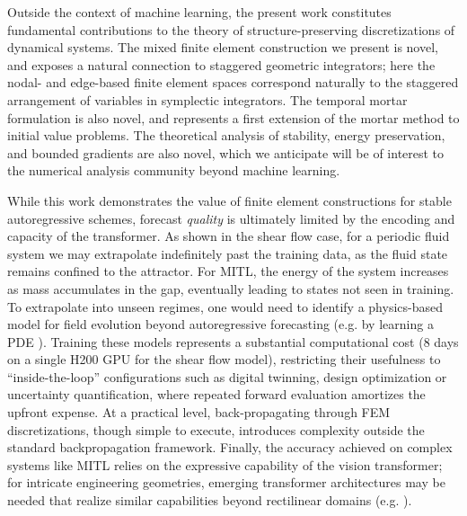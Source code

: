 \documentclass[12pt]{article}
\begin{document}
Outside the context of machine learning, the present work constitutes fundamental contributions to the theory of structure-preserving discretizations of dynamical systems. The mixed finite element construction we present is novel, and exposes a natural connection to staggered geometric integrators; here the nodal- and edge-based finite element spaces correspond naturally to the staggered arrangement of variables in symplectic integrators. The temporal mortar formulation is also novel, and represents a first extension of the mortar method to initial value problems. The theoretical analysis of stability, energy preservation, and bounded gradients are also novel, which we anticipate will be of interest to the numerical analysis community beyond machine learning.

While this work demonstrates the value of finite element constructions for stable autoregressive schemes, forecast \textit{quality} is ultimately limited by the encoding and capacity of the transformer. As shown in the shear flow case, for a periodic fluid system we may extrapolate indefinitely past the training data, as the fluid state remains confined to the attractor. For MITL, the energy of the system increases as mass accumulates in the gap, eventually leading to states not seen in training. To extrapolate into unseen regimes, one would need to identify a physics-based model for field evolution beyond autoregressive forecasting (e.g. by learning a PDE \cite{kinch2025structure}). Training these models represents a substantial computational cost (8 days on a single H200 GPU for the shear flow model), restricting their usefulness to ``inside-the-loop'' configurations such as digital twinning, design optimization or uncertainty quantification, where repeated forward evaluation amortizes the upfront expense. At a practical level, back-propagating through FEM discretizations, though simple to execute, introduces complexity outside the standard backpropagation framework. Finally, the accuracy achieved on complex systems like MITL relies on the expressive capability of the vision transformer; for intricate engineering geometries, emerging transformer architectures may be needed that realize similar capabilities beyond rectilinear domains (e.g. \cite{wu2024transolver,shaffer2026structure}).

\end{document}
